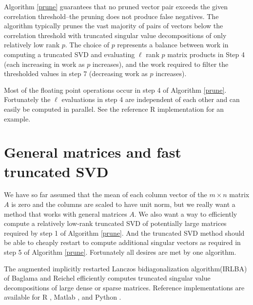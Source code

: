 \documentclass{article}
\let\proglang=\textsf
\numberwithin{algorithmctr}{section}
\begin{document}
Algorithm \ref{prune} guarantees that no pruned vector pair exceeds the given
correlation threshold--the pruning does not produce false negatives.  The
algorithm typically prunes the vast majority of pairs of vectors below the
correlation threshold with truncated singular value decompositions of only
relatively low rank $p$.  The choice of $p$ represents a balance between work
in computing a truncated SVD and evaluating $\ell$ rank $p$ matrix products in
Step 4 (each increasing in work as $p$ increases), and the work required to
filter the thresholded values in step 7 (decreasing work as $p$ increases).

Most of the floating point operations occur in step 4 of Algorithm \ref{prune}.
Fortunately the $\ell$ evaluations in step 4 are independent of each other and
can easily be computed in parallel. See the reference \proglang{R}
implementation \cite{sup} for an example.


\section{General matrices and fast truncated SVD}\label{irlba}

We have so far assumed that the mean of each column vector of the $m\times n$
matrix $A$ is zero and the columns are scaled to have unit norm, but we really
want a method that works with general matrices $A$.  We also want a way to
efficiently compute a relatively low-rank truncated SVD of potentially large
matrices required by step 1 of Algorithm \ref{prune}.  And the truncated SVD
method should be able to cheaply restart to compute additional singular vectors
as required in step 5 of Algorithm \ref{prune}. Fortunately all desires are met
by one algorithm.

The augmented implicitly restarted Lanczos bidiagonalization algorithm\break(IRLBA)
of Baglama and Reichel \cite{irlba} efficiently computes truncated singular value
decompositions of large dense or sparse matrices. Reference implementations are
available for \proglang{R} \cite{irlbar}, \proglang{Matlab} \cite{irlbam},
and \proglang{Python} \cite{irlbap}.
\end{document}
